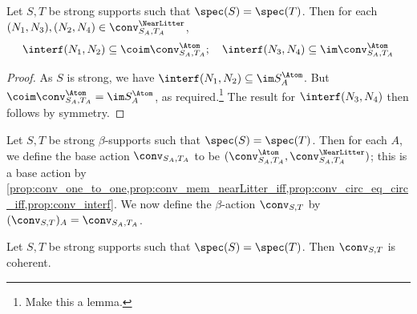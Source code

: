 \begin{proposition}
  \label{prop:conv_interf}
  Let \( S, T \) be strong supports such that \( \spec(S) = \spec(T) \).
  Then for each \( (N_1, N_3), (N_2, N_4) \in \conv_{S_A, T_A}^\NearLitter \),
  \[ \interf(N_1, N_2) \subseteq \coim \conv_{S_A, T_A}^\Atom;\quad \interf(N_3, N_4) \subseteq \im \conv_{S_A, T_A}^\Atom \]
\end{proposition}
\begin{proof}
  As \( S \) is strong, we have \( \interf(N_1, N_2) \subseteq \im S_A^\Atom \).
  But \( \coim \conv_{S_A, T_A}^\Atom = \im S_A^\Atom \), as required.\footnote{Make this a lemma.}
  The result for \( \interf(N_3, N_4) \) then follows by symmetry.
\end{proof}
\begin{definition}
  \label{def:conv}
  Let \( S, T \) be strong \( \beta \)-supports such that \( \spec(S) = \spec(T) \).
  Then for each \( A \), we define the base action \( \conv_{S_A, T_A} \) to be \( (\conv_{S_A, T_A}^\Atom, \conv_{S_A, T_A}^\NearLitter) \); this is a base action by \cref{prop:conv_one_to_one,prop:conv_mem_nearLitter_iff,prop:conv_circ_eq_circ_iff,prop:conv_interf}.
  We now define the \( \beta \)-action \( \conv_{S,T} \) by \( (\conv_{S,T})_A = \conv_{S_A,T_A} \).
\end{definition}
\begin{proposition}
  \label{prop:conv_coherent}
  Let \( S, T \) be strong supports such that \( \spec(S) = \spec(T) \).
  Then \( \conv_{S,T} \) is coherent.
\end{proposition}
